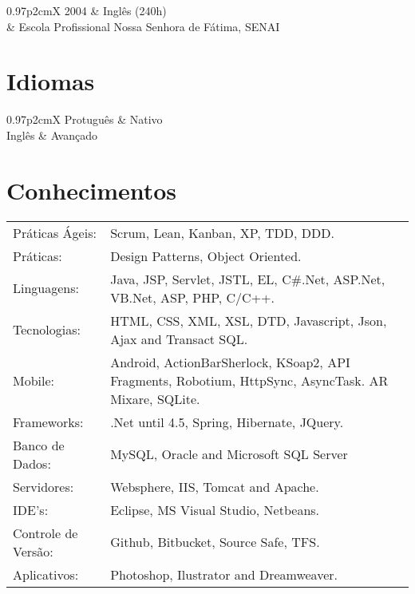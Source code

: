 \documentclass[a4paper, oneside, final]{article}
\begin{document}
\begin{center}
\begin{tabularx}{0.97\linewidth}{p{2cm}X}
2004       & Inglês (240h)\\
           & Escola Profissional Nossa Senhora de Fátima, SENAI
\end{tabularx}

%

\section{Idiomas}

\begin{tabularx}{0.97\linewidth}{p{2cm}X}
Protuguês      & Nativo\\
Inglês      & Avançado\\
\end{tabularx}

\section{Conhecimentos}

\begin{tabularx}{0.97\linewidth}{p{3.0cm}X}
Práticas Ágeis: 	& Scrum, Lean, Kanban, XP, TDD, DDD.\\
Práticas:  			& Design Patterns, Object Oriented.\\
Linguagens:       	& Java, JSP, Servlet, JSTL, EL, C\#.Net, ASP.Net, VB.Net, ASP, PHP, C/C++.\\
Tecnologias:    	& HTML, CSS, XML, XSL, DTD, Javascript, Json, Ajax and Transact SQL.\\
Mobile:          	& Android, ActionBarSherlock, KSoap2, API Fragments, Robotium, HttpSync, AsyncTask. AR Mixare, SQLite.\\
Frameworks:      	& .Net until 4.5, Spring, Hibernate, JQuery.\\
Banco de Dados:     & MySQL, Oracle and Microsoft SQL Server \\
Servidores:         & Websphere, IIS, Tomcat and Apache.\\
IDE's:            	& Eclipse, MS Visual Studio, Netbeans.\\
Controle de Versão: & Github, Bitbucket, Source Safe, TFS.\\
Aplicativos:    	& Photoshop, Ilustrator and Dreamweaver.\\
\end{tabularx}


\end{center}
\end{document}
